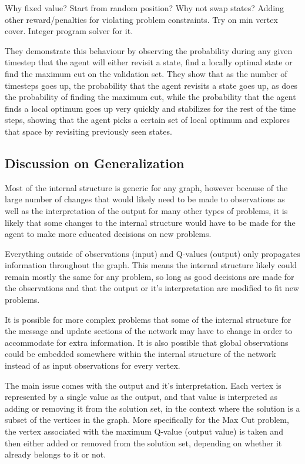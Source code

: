 \documentclass{article}
\begin{document}
Why fixed value?
Start from random position?
Why not swap states?
Adding other reward/penalties for violating problem constraints.
Try on min vertex cover. Integer program solver for it.


They demonstrate this behaviour by observing the probability during any given timestep that the agent will either revisit a state, find a locally optimal state or find the maximum cut on the validation set. They show that as the number of timesteps goes up, the probability that the agent revisits a state goes up, as does the probability of finding the maximum cut, while the probability that the agent finds a local optimum goes up very quickly and stabilizes for the rest of the time steps, showing that the agent picks a certain set of local optimum and explores that space by revisiting previously seen states.

\subsection{Discussion on Generalization}

Most of the internal structure is generic for any graph, however because of the large number of changes that would likely need to be made to observations as well as the interpretation of the output for many other types of problems, it is likely that some changes to the internal structure would have to be made for the agent to make more educated decisions on new problems.

Everything outside of observations (input) and Q-values (output) only propagates information throughout the graph. This means the internal structure likely could remain mostly the same for any problem, so long as good decisions are made for the observations and that the output or it's interpretation are modified to fit new problems.

It is possible for more complex problems that some of the internal structure for the message and update sections of the network may have to change in order to accommodate for extra information. It is also possible that global observations could be embedded somewhere within the internal structure of the network instead of as input observations for every vertex.

The main issue comes with the output and it's interpretation. Each vertex is represented by a single value as the output, and that value is interpreted as adding or removing it from the solution set, in the context where the solution is a subset of the vertices in the graph. More specifically for the Max Cut problem, the vertex associated with the maximum Q-value (output value) is taken and then either added or removed from the solution set, depending on whether it already belongs to it or not. 
\end{document}
